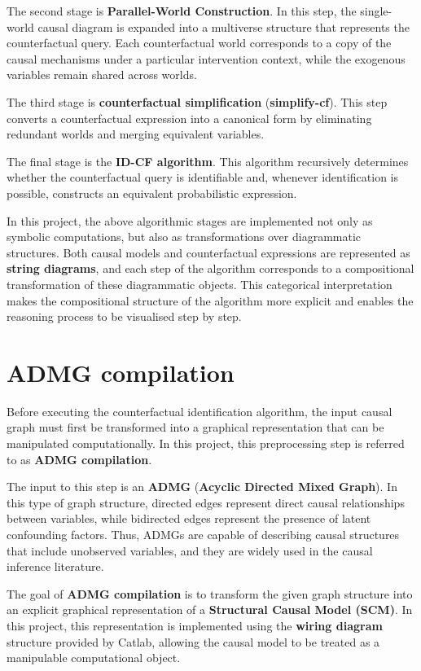 \documentclass[a4paper]{report}
\begin{document}
The second stage is \textbf{Parallel-World Construction}.
In this step, the single-world causal diagram is expanded into a multiverse structure that represents the counterfactual query. Each counterfactual world corresponds to a copy of the causal mechanisms under a particular intervention context, while the exogenous variables remain shared across worlds.

The third stage is \textbf{counterfactual simplification} (\textbf{simplify-cf}). 
This step converts a counterfactual expression into a canonical form by eliminating redundant worlds and merging equivalent variables.

The final stage is the \textbf{ID-CF algorithm}. 
This algorithm recursively determines whether the counterfactual query is identifiable and, whenever identification is possible, constructs an equivalent probabilistic expression.

In this project, the above algorithmic stages are implemented not only as symbolic computations, but also as transformations over diagrammatic structures. 
Both causal models and counterfactual expressions are represented as \textbf{string diagrams}, and each step of the algorithm corresponds to a compositional transformation of these diagrammatic objects. This categorical interpretation makes the compositional structure of the algorithm more explicit and enables the reasoning process to be visualised step by step.

\section{ADMG compilation}

Before executing the counterfactual identification algorithm, the input causal graph must first be transformed into a graphical representation that can be manipulated computationally. In this project, this preprocessing step is referred to as \textbf{ADMG compilation}.

The input to this step is an \textbf{ADMG} (\textbf{Acyclic Directed Mixed Graph}). In this type of graph structure, directed edges represent direct causal relationships between variables, while bidirected edges represent the presence of latent confounding factors. Thus, ADMGs are capable of describing causal structures that include unobserved variables, and they are widely used in the causal inference literature.

The goal of \textbf{ADMG compilation} is to transform the given graph structure into an explicit graphical representation of a \textbf{Structural Causal Model (SCM)}. 
In this project, this representation is implemented using the \textbf{wiring diagram} structure provided by Catlab, allowing the causal model to be treated as a manipulable computational object.
\end{document}
